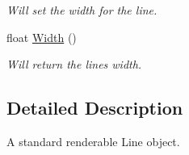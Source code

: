 \begin{DoxyCompactItemize}
\begin{DoxyCompactList}\small\item\em Will set the width for the line. \end{DoxyCompactList}\item 
\hypertarget{classc_line_a26247a346a469646b250fa0116e1ec34}{
float \hyperlink{classc_line_a26247a346a469646b250fa0116e1ec34}{Width} ()}
\label{classc_line_a26247a346a469646b250fa0116e1ec34}

\begin{DoxyCompactList}\small\item\em Will return the lines width. \end{DoxyCompactList}\end{DoxyCompactItemize}


\subsection{Detailed Description}
A standard renderable Line object. 
